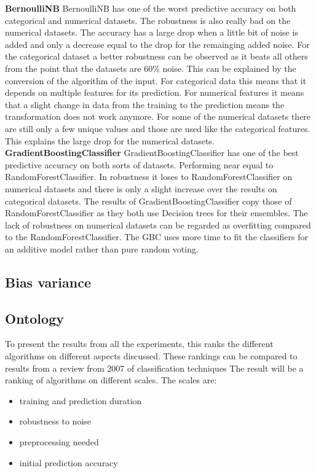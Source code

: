 \documentclass[a4paper,10pt]{article}
\begin{document}
\textbf{BernoulliNB} BernoulliNB has one of the worst predictive accuracy on both categorical and numerical datasets. The robustness is also really  bad on the numerical datasets. The accuracy has a large drop when a little bit of noise is added and only a decrease equal to the drop for the remainging added noise. For the categorical dataset a better robustness can be observed as it beats all others from the point that the datasets are 60$\%$ noise. This can be explained by the conversion of the algorithm of the input. For categorical data this means that it depends on multiple features for its prediction. For numerical features it means that a slight change in data from the training to the prediction means the transformation does not work anymore. For some of the numerical datasets there are still only a few unique values and those are used like the categorical features. This explains the large drop for the numerical datasets.  \\

\textbf{GradientBoostingClassifier} GradientBoostingClassifier has one of the best predictive accuracy on both sorts of datasets. Performing near equal to RandomForestClassifier. In robustness it loses to RandomForestClassifier on numerical datasets and there is only a slight increase over the results on categorical datasets. The results of GradientBoostingClassifier copy those of RandomForestClassifier as they both use Decision trees for their ensembles. The lack of robustness on numerical datasets can be regarded as overfitting compared to the RandomForestClassifier. The GBC uses more time to fit the classifiers for an additive model rather than pure random voting.\\


\subsection{Bias variance}


\subsection{Ontology}
To present the results from all the experiments, this ranks the different algorithms on different aspects discussed.
These rankings can be compared to results from a review from 2007 of classification techniques \cite{RevClass}
The result will be a ranking of algorithms on different scales. The scales are:
\begin{itemize}
	\item training and prediction duration
	\item robustness to noise
	\item preprocessing needed
	\item initial prediction accuracy
\end{itemize} 
\end{document}

